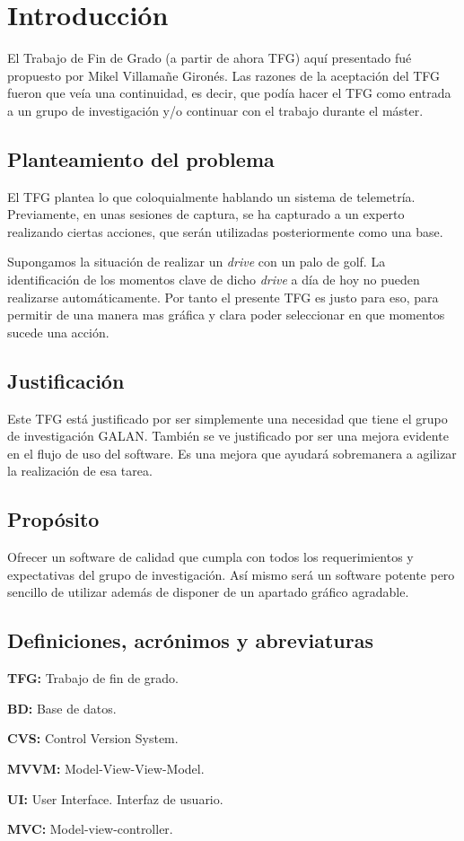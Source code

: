 \chapter{Introducci\'{o}n} 
El Trabajo de Fin de Grado (a partir de ahora TFG) aqu\'{i} presentado fu\'{e} propuesto por Mikel Villama\~{n}e Giron\'{e}s.
Las razones de la aceptaci\'{o}n del TFG fueron que ve\'{i}a una continuidad, es decir, que pod\'{i}a hacer el TFG como entrada
a un grupo de investigaci\'{o}n y/o continuar con el trabajo durante el m\'{a}ster.

\section{Planteamiento del problema}
El TFG plantea lo que coloquialmente hablando un sistema de telemetr\'{i}a. Previamente, en unas sesiones de captura, se ha capturado
a un experto realizando ciertas acciones, que ser\'{a}n utilizadas posteriormente como una base.

Supongamos la situaci\'{o}n de realizar un \emph{drive} con un palo de golf. La identificaci\'{o}n de los momentos clave de dicho \emph{drive}
a d\'{i}a de hoy no pueden realizarse autom\'{a}ticamente. Por tanto el presente TFG es justo para eso, para permitir de una manera
mas gr\'{a}fica y clara poder seleccionar en que momentos sucede una acci\'{o}n.

\section{Justificaci\'{o}n}

Este TFG est\'{a} justificado por ser simplemente una necesidad que tiene el grupo de investigaci\'{o}n GALAN. Tambi\'{e}n se ve justificado
por ser una mejora evidente en el flujo de uso del software. Es una mejora que ayudar\'{a} sobremanera a agilizar la realizaci\'{o}n de esa tarea.

\section{Prop\'{o}sito}
Ofrecer un software de calidad que cumpla con todos los requerimientos y expectativas del grupo de investigaci\'{o}n.
As\'{i} mismo ser\'{a} un software potente pero sencillo de utilizar adem\'{a}s de disponer de un apartado gr\'{a}fico agradable.

\section{Definiciones, acr\'{o}nimos y abreviaturas}
\textbf{TFG:} Trabajo de fin de grado.

\textbf{BD:} Base de datos.

\textbf{CVS:} Control Version System.

\textbf{MVVM:} Model-View-View-Model.

\textbf{UI:} User Interface. Interfaz de usuario.

\textbf{MVC:} Model-view-controller.
 
